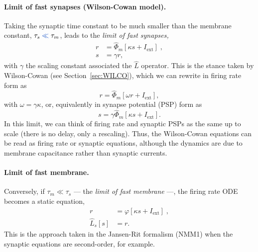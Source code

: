 \documentclass[12pt]{article}
\numberwithin{equation}{section}
\newcommand{\rev}[1]{\begingroup\color{navyblue}#1\endgroup}
\begin{document}
\paragraph{Limit of fast synapses (Wilson-Cowan model).} Taking the synaptic time constant to be much smaller than the membrane constant,  $\tau_s %
\rev{\ll} \tau_m$, leads to the \textit{limit of fast synapses, }
\begin{equation}\label{eq:wilco0}
\begin{aligned}
r &=  \hat \Phi_m [\kappa s +  I_\text{ext}] \;,\\
 s &= \gamma r,
 \end{aligned}
\end{equation}
with $\gamma$ the scaling constant associated the $\hat L$ operator. This is the stance taken by Wilson-Cowan (see  Section~\ref{sec:WILCO}), which we can rewrite in firing rate form as 
\begin{equation}\label{eq:wilco0-op}
 r =  \hat \Phi_m [\omega r +  I_\text{ext}] ,
\end{equation}
with $\omega= \gamma \kappa$, or, equivalently in synapse potential (PSP) form as
\begin{equation}\label{eq:wilco0-op-s}
 s =  \gamma \hat \Phi_m [\kappa s +  I_\text{ext}].
\end{equation}
In this limit, we can think of firing rate and synaptic PSPs as the same up to scale (there is no delay, only a rescaling). Thus, the Wilson-Cowan equations can be read as firing rate or synaptic equations, although the dynamics are due to membrane capacitance rather than synaptic currents.


 \paragraph{Limit of fast membrane.} Conversely, if \rev{$\tau_m \ll \tau_s$} --- the \textit{limit of fast membrane} ---, the firing rate ODE becomes a static equation,
\begin{equation}
\begin{aligned}
 r  &=  \varphi[\kappa s +  I_\text{ext}] \;,\\
 \hat L_s[s] &=  r.
 \end{aligned}
\end{equation}
This is the approach taken in the Jansen-Rit formalism (NMM1) when the synaptic equations are second-order, for example.
\end{document}
